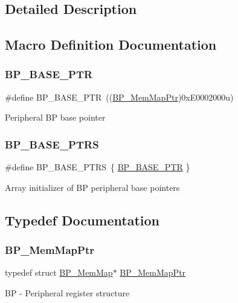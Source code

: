 \subsection{Detailed Description}


\subsection{Macro Definition Documentation}
\mbox{\label{group___b_p___peripheral_ga375cd6d2e7ec414f4e33cb54d5494940}} 
\subsubsection{\texorpdfstring{B\+P\+\_\+\+B\+A\+S\+E\+\_\+\+P\+TR}{BP\_BASE\_PTR}}
{\footnotesize\ttfamily \#define B\+P\+\_\+\+B\+A\+S\+E\+\_\+\+P\+TR~((\hyperlink{group___b_p___peripheral_gaa250950ffe336f8c6e5895e3a1e4ca86}{B\+P\+\_\+\+Mem\+Map\+Ptr})0x\+E0002000u)}

Peripheral BP base pointer \mbox{\label{group___b_p___peripheral_ga6c07114ad41ccb42b134e8834f123598}} 
\subsubsection{\texorpdfstring{B\+P\+\_\+\+B\+A\+S\+E\+\_\+\+P\+T\+RS}{BP\_BASE\_PTRS}}
{\footnotesize\ttfamily \#define B\+P\+\_\+\+B\+A\+S\+E\+\_\+\+P\+T\+RS~\{ \hyperlink{group___b_p___peripheral_ga375cd6d2e7ec414f4e33cb54d5494940}{B\+P\+\_\+\+B\+A\+S\+E\+\_\+\+P\+TR} \}}

Array initializer of BP peripheral base pointers 

\subsection{Typedef Documentation}
\mbox{\label{group___b_p___peripheral_gaa250950ffe336f8c6e5895e3a1e4ca86}} 
\subsubsection{\texorpdfstring{B\+P\+\_\+\+Mem\+Map\+Ptr}{BP\_MemMapPtr}}
{\footnotesize\ttfamily typedef struct \hyperlink{struct_b_p___mem_map}{B\+P\+\_\+\+Mem\+Map}$\ast$ \hyperlink{group___b_p___peripheral_gaa250950ffe336f8c6e5895e3a1e4ca86}{B\+P\+\_\+\+Mem\+Map\+Ptr}}

BP -\/ Peripheral register structure 